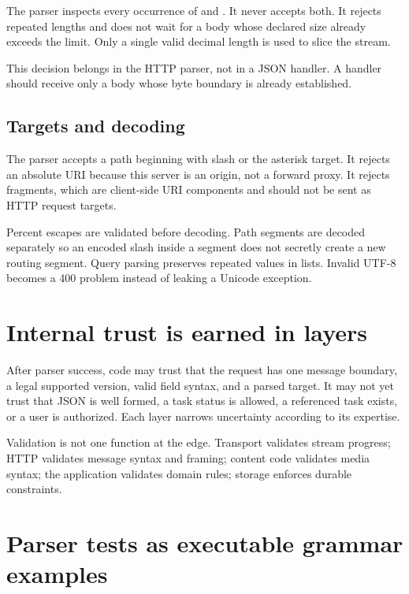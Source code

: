 The parser inspects every occurrence of  and
. It never accepts both. It rejects repeated lengths and
does not wait for a body whose declared size already exceeds the limit. Only a
single valid decimal length is used to slice the stream.

This decision belongs in the HTTP parser, not in a JSON handler. A handler should
receive only a body whose byte boundary is already established.

\subsection{Targets and decoding}

The parser accepts a path beginning with slash or the asterisk target. It rejects
an absolute URI because this server is an origin, not a forward proxy. It rejects
fragments, which are client-side URI components and should not be sent as HTTP
request targets.

Percent escapes are validated before decoding. Path segments are decoded
separately so an encoded slash inside a segment does not secretly create a new
routing segment. Query parsing preserves repeated values in lists. Invalid UTF-8
becomes a 400 problem instead of leaking a Unicode exception.

\section{Internal trust is earned in layers}

After parser success, code may trust that the request has one message boundary,
a legal supported version, valid field syntax, and a parsed target. It may not
yet trust that JSON is well formed, a task status is allowed, a referenced task
exists, or a user is authorized. Each layer narrows uncertainty according to
its expertise.

\begin{mentalmodel}
Validation is not one function at the edge. Transport validates stream progress;
HTTP validates message syntax and framing; content code validates media syntax;
the application validates domain rules; storage enforces durable constraints.
\end{mentalmodel}

\section{Parser tests as executable grammar examples}

